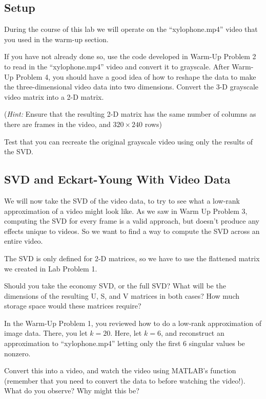 \subsection{Setup}

During the course of this lab we will operate on the ``xylophone.mp4'' video that you used in the warm-up section.

If you have not already done so, use the code developed in Warm-Up Problem 2 to read in the ``xylophone.mp4'' video and convert it to grayscale. After Warm-Up Problem 4, you should have a good idea of how to reshape the data to make the three-dimensional video data into two dimensions. Convert the 3-D grayscale video matrix into a 2-D matrix.

(\textit{Hint:} Ensure that the resulting 2-D matrix has the same number of columns as there are frames in the video, and $320 \times 240$ rows)

Test that you can recreate the original grayscale video using only the results of the SVD.

\subsection{SVD and Eckart-Young With Video Data}

We will now take the SVD of the video data, to try to see what a low-rank approximation of a video might look like. As we saw in Warm Up Problem 3, computing the SVD for every frame is a valid approach, but doesn't produce any effects unique to videos. So we want to find a way to compute the SVD across an entire video.

The SVD is only defined for 2-D matrices, so we have to use the flattened matrix we created in Lab Problem 1.

Should you take the economy SVD, or the full SVD? What will be the dimensions of the resulting U, S, and V matrices in both cases? How much storage space would these matrices require?

In the Warm-Up Problem 1, you reviewed how to do a low-rank approximation of image data. There, you let $k = 20$. Here, let $k = 6$, and reconstruct an approximation to ``xylophone.mp4'' letting only the first 6 singular values be nonzero.

Convert this into a video, and watch the video using MATLAB's  function (remember that you need to convert the data to  before watching the video!). What do you observe? Why might this be?

